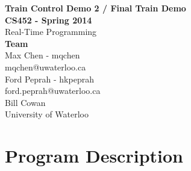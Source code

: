 \documentclass[12pt]{article}
\begin{document}
\thispagestyle{empty}
\begin{center}
  {\bf\Large Train Control Demo 2 / Final Train Demo}\\
  {\bf\large CS452 - Spring 2014}\\
  Real-Time Programming\vspace{5cm}\\
  {\bf Team }\\
  Max Chen - mqchen\\
  mqchen@uwaterloo.ca\\[1\baselineskip]
  Ford Peprah - hkpeprah\\
  ford.peprah@uwaterloo.ca\vspace{5cm}\\
  Bill Cowan\\
  University of Waterloo\\
\end{center}
\newpage
\thispagestyle{empty}
\tableofcontents
\newpage
\section{Program Description}
\end{document}
